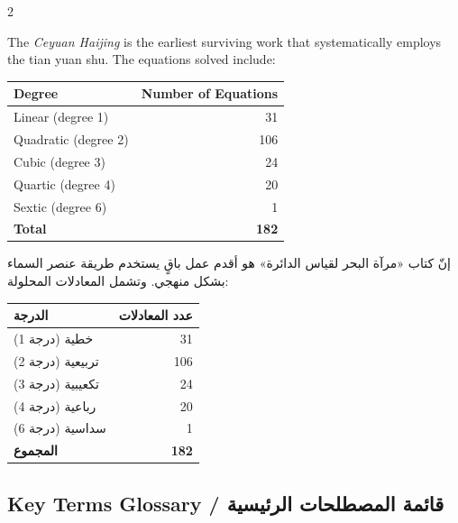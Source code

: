 \documentclass[11pt,a4paper]{article}
\newcommand{\ar}[1]{\arabicfont\beginR #1\endR}
\begin{document}
\begin{paracol}{2}

The \textit{Ceyuan Haijing} is the earliest surviving work that systematically employs the tian yuan shu. The equations solved include:

\begin{center}
\begin{tabular}{lr}
\toprule
\textbf{Degree} & \textbf{Number of Equations} \\
\midrule
Linear (degree 1) & 31 \\
Quadratic (degree 2) & 106 \\
Cubic (degree 3) & 24 \\
Quartic (degree 4) & 20 \\
Sextic (degree 6) & 1 \\
\midrule
\textbf{Total} & \textbf{182} \\
\bottomrule
\end{tabular}
\end{center}

\switchcolumn

\ar{إنّ كتاب «مرآة البحر لقياس الدائرة» هو أقدم عمل باقٍ يستخدم طريقة عنصر السماء بشكل منهجي. وتشمل المعادلات المحلولة:}

\begin{center}
\begin{tabular}{lr}
\toprule
\textbf{\ar{الدرجة}} & \textbf{\ar{عدد المعادلات}} \\
\midrule
\ar{خطية (درجة 1)} & 31 \\
\ar{تربيعية (درجة 2)} & 106 \\
\ar{تكعيبية (درجة 3)} & 24 \\
\ar{رباعية (درجة 4)} & 20 \\
\ar{سداسية (درجة 6)} & 1 \\
\midrule
\textbf{\ar{المجموع}} & \textbf{182} \\
\bottomrule
\end{tabular}
\end{center}

\end{paracol}

\vspace{0.5cm}

\subsection{Key Terms Glossary / \ar{قائمة المصطلحات الرئيسية}}
\end{document}
